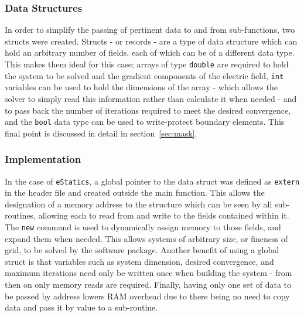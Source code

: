 	\subsubsection{Data Structures}
	
		In order to simplify the passing of pertinent data to and from sub-functions, two structs were created. Structs - or records - are a type of data structure which can hold an arbitrary number of fields, each of which can be of a different data type. This makes them ideal for this case; arrays of type \lstinline|double| are required to hold the system to be solved and the gradient components of the electric field, \lstinline|int| variables can be used to hold the dimensions of the array - which allows the solver to simply read this information rather than calculate it when needed - and to pass back the number of iterations required to meet the desired convergence, and the \lstinline|bool| data type can be used to write-protect boundary elements. This final point is discussed in detail in section~\ref{sec:mask}.
		
		\subsubsection{Implementation}
		
		In the case of \lstinline|eStatics|, a global pointer to the data struct was defined as \lstinline|extern| in the header file and created outside the main function. This allows the designation of a memory address to the structure which can be seen by all sub-routines, allowing each to read from and write to the fields contained within it. The \lstinline|new| command is used to dynamically assign memory to those fields, and expand them when needed. This allows systems of arbitrary size, or fineness of grid, to be solved by the software package. Another benefit of using a global struct is that variables such as system dimension, desired convergence, and maximum iterations need only be written once when building the system - from then on only memory reads are required. Finally, having only one set of data to be passed by address lowers RAM overhead due to there being no need to copy data and pass it by value to a sub-routine.
